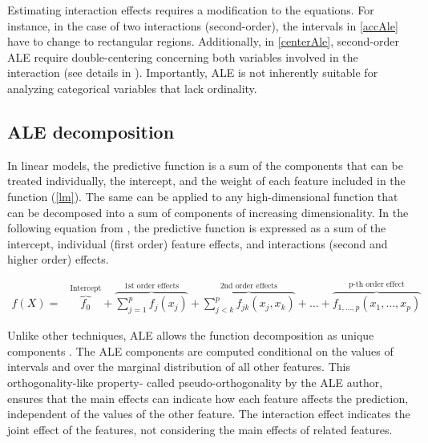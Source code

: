 Estimating interaction effects requires a modification to the equations. For instance, in the case of two interactions (second-order), the intervals in \ref{accAle} have to change to rectangular regions. Additionally, in \ref{centerAle}, second-order \gls{ALE} require double-centering concerning both variables involved in the interaction (see details in \cite{Apley2020VisualizingModels}). Importantly, \gls{ALE} is not inherently suitable for analyzing categorical variables that lack ordinality.

\subsection{ALE decomposition}

In linear models, the predictive function is a sum of the components that can be treated individually, the intercept, and the weight of each feature included in the function (\ref{lm}). The same can be applied to any high-dimensional function that can be decomposed into a sum of components of increasing dimensionality. In the following equation from \cite{Molnar2019QuantifyingInterpretability}, the predictive function is expressed as a sum of the intercept, individual (first order) feature effects, and interactions (second and higher order) effects.

\begin{eqnarray}\label{eqn:decomp} f(X)  = &\overbrace{f_0}^\text{Intercept} + \overbrace{\sum_{j=1}^p f_j(x_j)}^\text{1st order effects} + \overbrace{\sum_{j<k}^p f_{jk}(x_j, x_k)}^\text{2nd order effects} + \ldots + \overbrace{f_{1,\ldots,p}(x_1, \ldots, x_p)}^\text{p-th order effect}
\end{eqnarray}

Unlike other techniques, \gls{ALE} allows the function decomposition as unique components \cite{Apley2020VisualizingModels}. The \gls{ALE} components are computed conditional on the values of intervals and over the marginal distribution of all other features. This orthogonality-like property- called pseudo-orthogonality by the \gls{ALE} author, ensures that the main effects can indicate how each feature affects the prediction, independent of the values of the other feature. The interaction effect indicates the joint effect of the features, not considering the main effects of related features. 
